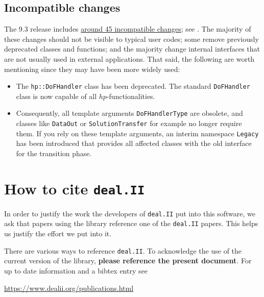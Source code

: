 \documentclass{ansarticle-preprint}
\newcommand{\specialword}[1]{\texttt{#1}}
\newcommand{\dealii}{{\specialword{deal.II}}\xspace}
\begin{document}
\subsection{Incompatible changes}

The 9.3 release includes
\href{https://dealii.org/developer/doxygen/deal.II/changes_between_9_2_0_and_9_3_0.html}
{around 45 incompatible changes}; see \cite{changes93}. The majority of these changes
should not be visible to typical user codes; some remove previously
deprecated classes and functions; and the majority change internal
interfaces that are not usually used in external
applications. That said, the following are worth mentioning since they
may have been more widely used:
\begin{itemize}
  \item The \texttt{hp::DoFHandler} class has been deprecated. The standard
        \texttt{DoFHandler} class is now capable of all $hp$-functionalities.
  \item Consequently, all template arguments \texttt{DoFHandlerType} are obsolete,
        and classes like \texttt{DataOut} or \texttt{SolutionTransfer} for example
        no longer require them. If you rely on these template arguments, an interim
        namespace \texttt{Legacy} has been introduced that provides all affected
        classes with the old interface for the transition phase.
\end{itemize}



\section{How to cite \dealii}\label{sec:cite}

In order to justify the work the developers of \dealii{} put into this
software, we ask that papers using the library reference one of the
\dealii{} papers. This helps us justify the effort we put into it.

There are various ways to reference \dealii{}. To acknowledge the use of
the current version of the library, \textbf{please reference the present
  document}. For up to date information and a bibtex entry
see
\begin{center}
  \url{https://www.dealii.org/publications.html}
\end{center}
\end{document}
